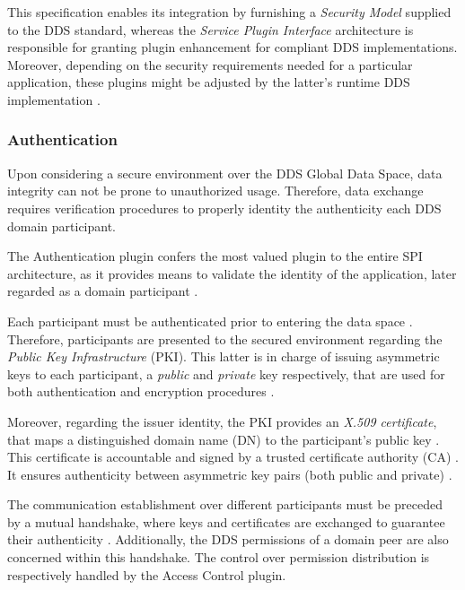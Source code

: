 This specification enables its integration by furnishing a \textit{Security Model} supplied to the DDS standard, whereas the \textit{Service Plugin Interface} architecture is responsible for granting plugin enhancement for compliant DDS implementations. Moreover, depending on the security requirements needed for a particular application, these plugins might be adjusted by the latter's runtime DDS implementation \cite{dds-s}.

\subsubsection{Authentication}

Upon considering a secure environment over the DDS Global Data Space, data integrity can not be prone to unauthorized usage. Therefore, data exchange requires verification procedures to properly identity the authenticity each DDS domain participant.

The Authentication plugin confers the most valued plugin to the entire SPI architecture, as it provides means to validate the identity of the application, later regarded as a domain participant \cite{dds-s, ros-dds-integration}. 

Each participant must be authenticated prior to entering the data space \cite{white2019network}. Therefore, participants are presented to the secured environment regarding the \textit{Public Key Infrastructure} (PKI). This latter is in charge of issuing asymmetric keys to each participant, a \textit{public} and \textit{private} key respectively, that are used for both authentication and encryption procedures \cite{diluoffo2018robot, ros-dds-integration}. 

Moreover, regarding the issuer identity, the PKI provides an \textit{X.509 certificate}, that maps a distinguished domain name (DN) to the participant's public key \cite{diluoffo2018robot, white2016sros}. This certificate is accountable and signed by a trusted certificate authority (CA) \cite{white2019network, white2016sros, ros-dds-integration}. It ensures authenticity between asymmetric key pairs (both public and private) \cite{diluoffo2018robot}. 

The communication establishment over different participants must be preceded by a mutual handshake, where keys and certificates are exchanged to guarantee their authenticity \cite{white2019network, kim2018security}. Additionally, the DDS permissions of a domain peer are also concerned within this handshake. The control over permission distribution is respectively handled by the Access Control plugin.

